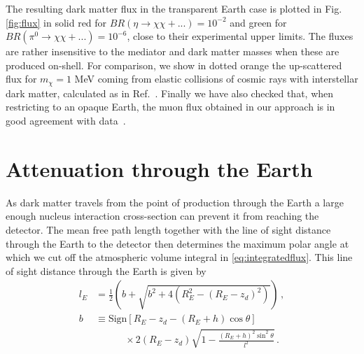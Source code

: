 The resulting dark matter flux in the transparent Earth case is plotted in Fig. \ref{fig:flux} in solid red for $BR(\eta \to \chi \chi + ...) = 10^{-2}$ and green for $BR(\pi^0 \to \chi\chi + ...) = 10^{-6}$, close to their experimental upper limits. The fluxes are rather insensitive to the mediator and dark matter masses when these are produced on-shell. For comparison, we show in dotted orange the up-scattered flux for $m_\chi = 1$ MeV coming from elastic collisions of cosmic rays with interstellar dark matter, calculated as in Ref.~\cite{Bringmann:2018cvk}. Finally we have also checked that, when restricting to an opaque Earth, the muon flux obtained in our approach is in good agreement with data~\cite{Haino:2004nq,Tanabashi:2018oca}.

\section{Attenuation through the Earth}

As dark matter travels from the point of production through the Earth a large enough nucleus interaction cross-section can prevent it from reaching the detector. The mean free path length together with the line of sight distance through the Earth to the detector then determines the maximum polar angle at which we cut off the atmospheric volume integral in \eqref{eq:integratedflux}. This line of sight distance through the Earth is given by
%
\begin{align}
l_E &= \frac{1}{2}\left( b + \sqrt{b^2 + 4(R_E^2 - (R_E - z_d)^2)} \right) \, , \nonumber \\
b &\equiv \text{Sign}\left[R_E - z_d - (R_E + h)\cos\theta \right]  \nonumber \\
& \quad \quad \quad \times 2(R_E - z_d) \sqrt{1 - \frac{(R_E +h)^2 \sin^2\theta}{l^2}} \, .
\end{align}
%

